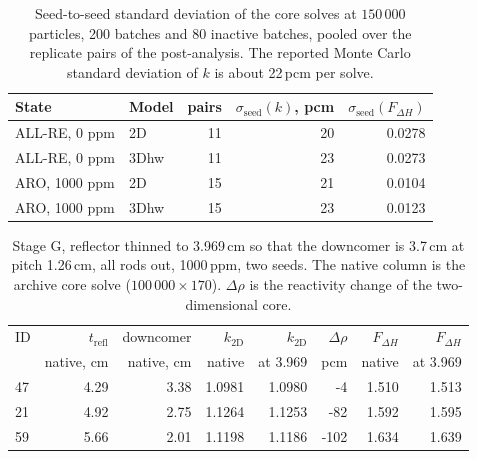 \begin{table}[htbp]
  \centering
  \footnotesize
  \caption{Seed-to-seed standard deviation of the core solves at $150\,000$ particles, 200 batches and 80 inactive batches, pooled over the replicate pairs of the post-analysis. The reported Monte Carlo standard deviation of $k$ is about 22\,pcm per solve.}
  \label{tab:c8-post-sigma}
  \begin{tabular}{@{}l l r r r@{}}
    \toprule
    State & Model & pairs & $\sigma_\mathrm{seed}(k)$, pcm & $\sigma_\mathrm{seed}(F_{\Delta H})$ \\
    \midrule
    ALL-RE, 0 ppm & 2D & 11 & 20 & 0.0278 \\
    ALL-RE, 0 ppm & 3Dhw & 11 & 23 & 0.0273 \\
    ARO, 1000 ppm & 2D & 15 & 21 & 0.0104 \\
    ARO, 1000 ppm & 3Dhw & 15 & 23 & 0.0123 \\
    \bottomrule
  \end{tabular}
\end{table}

\begin{table}[htbp]
  \centering
  \footnotesize
  \caption{Stage G, reflector thinned to 3.969\,cm so that the downcomer is 3.7\,cm at pitch 1.26\,cm, all rods out, 1000\,ppm, two seeds. The native column is the archive core solve ($100\,000 \times 170$). $\Delta\rho$ is the reactivity change of the two-dimensional core.}
  \label{tab:c8-post-downcomer}
  \setlength{\tabcolsep}{3pt}\scriptsize
  \begin{tabular}{@{}l r r r r r r r@{}}
    \toprule
    ID & $t_\mathrm{refl}$ & downcomer & $k_\mathrm{2D}$ & $k_\mathrm{2D}$ & $\Delta\rho$ & $F_{\Delta H}$ & $F_{\Delta H}$ \\
       & native, cm & native, cm & native & at 3.969 & pcm & native & at 3.969 \\
    \midrule
    47 & 4.29 & 3.38 & 1.0981 & 1.0980 & -4 & 1.510 & 1.513 \\
    21 & 4.92 & 2.75 & 1.1264 & 1.1253 & -82 & 1.592 & 1.595 \\
    59 & 5.66 & 2.01 & 1.1198 & 1.1186 & -102 & 1.634 & 1.639 \\
    \bottomrule
  \end{tabular}
\end{table}


